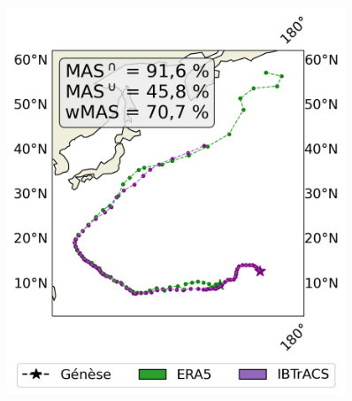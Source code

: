 \documentclass[aspectratio=169, usepdftitle=false, xcolor={dvipsnames}, 9pt,table]{beamer}
\begin{document}
\begin{frame}[t]
\begin{columns}[t]
\begin{column}{0.33\textwidth}
{\begin{figure}
                     \includegraphics[width=0.9\textwidth]{Figures/exemple_similarity.png}
                 \end{figure}
             }
         \end{column}
     \end{columns}
 \end{frame}
 
\end{document}
